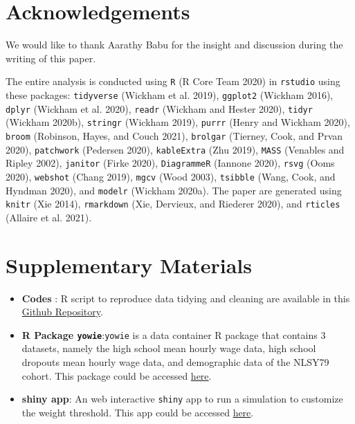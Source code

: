 \documentclass{article}
\begin{document}
\hypertarget{acknowledgements}{%
\section{Acknowledgements}\label{acknowledgements}}

We would like to thank Aarathy Babu for the insight and discussion during the writing of this paper.

The entire analysis is conducted using \texttt{R} (R Core Team 2020) in \texttt{rstudio} using these packages: \texttt{tidyverse} (Wickham et al. 2019), \texttt{ggplot2} (Wickham 2016), \texttt{dplyr} (Wickham et al. 2020), \texttt{readr} (Wickham and Hester 2020), \texttt{tidyr} (Wickham 2020b), \texttt{stringr} (Wickham 2019), \texttt{purrr} (Henry and Wickham 2020), \texttt{broom} (Robinson, Hayes, and Couch 2021), \texttt{brolgar} (Tierney, Cook, and Prvan 2020), \texttt{patchwork} (Pedersen 2020), \texttt{kableExtra} (Zhu 2019), \texttt{MASS} (Venables and Ripley 2002), \texttt{janitor} (Firke 2020), \texttt{DiagrammeR} (Iannone 2020), \texttt{rsvg} (Ooms 2020), \texttt{webshot} (Chang 2019), \texttt{mgcv} (Wood 2003), \texttt{tsibble} (Wang, Cook, and Hyndman 2020), and \texttt{modelr} (Wickham 2020a). The paper are generated using \texttt{knitr} (Xie 2014), \texttt{rmarkdown} (Xie, Dervieux, and Riederer 2020), and \texttt{rticles} (Allaire et al. 2021).

\hypertarget{supplementary-materials}{%
\section{Supplementary Materials}\label{supplementary-materials}}

\begin{itemize}
\item
  \textbf{Codes} : R script to reproduce data tidying and cleaning are available in this \href{https://github.com/numbats/yowie/blob/master/data-raw/data_preprocessing.R}{Github Repository}.
\item
  \textbf{R Package \texttt{yowie}}:\texttt{yowie} is a data container R package that contains 3 datasets, namely the high school mean hourly wage data, high school dropouts mean hourly wage data, and demographic data of the NLSY79 cohort. This package could be accessed \href{https://github.com/numbats/yowie}{here}.
\item
  \textbf{shiny app}: An web interactive \texttt{shiny} app to run a simulation to customize the weight threshold. This app could be accessed \href{https://github.com/numbats/summer-wages-refresh/tree/main/app}{here}.
\end{itemize}
\end{document}
